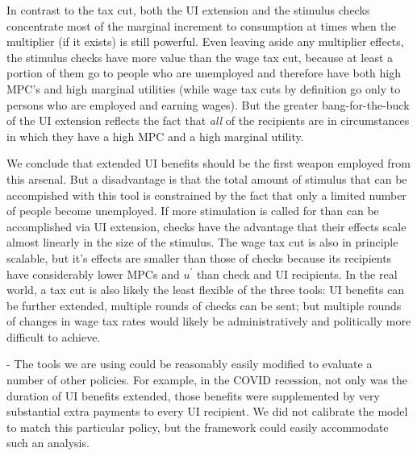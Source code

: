 \documentclass[../HAFiscal]{subfiles}
\begin{document}
In contrast to the tax cut, both the UI extension and the stimulus checks concentrate most of the marginal increment to consumption at times when the multiplier (if it exists) is still powerful.  Even leaving aside any multiplier effects, the stimulus checks have more value than the wage tax cut, because at least a portion of them go to people who are unemployed and therefore have both high MPC's and high marginal utilities (while wage tax cuts by definition go only to persons who are employed and earning wages).  But the greater bang-for-the-buck of the UI extension reflects the fact that \textit{all} of the recipients are in circumstances in which they have a high MPC and a high marginal utility.

We conclude that extended UI benefits should be the first weapon employed from this arsenal.  But a disadvantage is that the total amount of stimulus that can be accompished with this tool is constrained by the fact that only a limited number of people become unemployed.  If more stimulation is called for than can be accomplished via UI extension, checks have the advantage that their effects scale almost linearly in the size of the stimulus.  The wage tax cut is also in principle scalable, but it's effects are smaller than those of checks because its recipients have considerably lower MPCs and $u^{\prime}$ than check and UI recipients.  In the real world, a tax cut is also likely the least flexible of the three tools:  UI benefits can be further extended, multiple rounds of checks can be sent; but multiple rounds of changes in wage tax rates would likely be administratively and politically more difficult to achieve.

- The tools we are using could be reasonably easily modified to evaluate a number of other policies.  For example, in the COVID recession, not only was the duration of UI benefits extended, those benefits were supplemented by very substantial extra payments to every UI recipient.  We did not calibrate the model to match this particular policy, but the framework could easily accommodate such an analysis.
\end{document}
